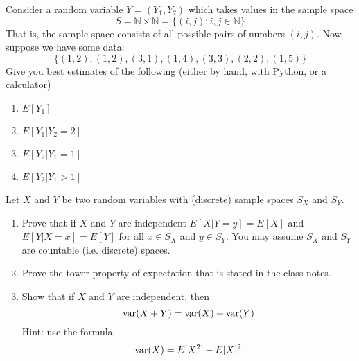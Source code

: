 \begin{exercise}
Consider a random variable $Y = (Y_1,Y_2)$ which takes values in the sample space
\begin{equation*}
S = {\mathbb N} \times {\mathbb N} = \{(i,j):i,j \in {\mathbb N}\}
\end{equation*}
That is, the sample space consists of all possible pairs of numbers $(i,j)$. Now suppose we have some data:
\begin{equation*}
\{(1,2),(1,2),(3,1),(1,4),(3,3),(2,2),(1,5)\}
\end{equation*}
Give you best estimates of the following (either by hand, with Python, or a calculator)
\begin{enumerate}[label=(\alph*)]
\item $E[Y_1]$
\item $E[Y_1|Y_2=2]$
\item $E[Y_2|Y_1=1]$
\item $E[Y_2|Y_1>1]$
\end{enumerate}




\begin{exercise}
Let $X$ and $Y$ be two random variables with (discrete) sample spaces $S_X$ and $S_Y$.  
\begin{enumerate}[label=(\alph*)]
\item Prove that if $X$ and $Y$ are independent $E[X|Y=y]=E[X]$ and $E[Y|X=x]=E[Y]$ for all $x \in S_X$ and $y \in S_Y$.  You may assume $S_X$ and $S_Y$ are countable (i.e. discrete) spaces. 
\item Prove the tower property of expectation that is stated in the class notes. 
\item Show that if $X$ and $Y$ are independent, then 
\begin{equation*}
{\rm var}(X+Y) = {\rm var}(X) + {\rm var}(Y)
\end{equation*} 
Hint: use the formula
\begin{equation*}
{\rm var}(X) = E[X^2]-E[X]^2
\end{equation*}
\end{enumerate}
\end{exercise}




\end{exercise}
